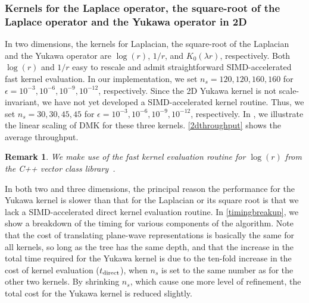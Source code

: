 \documentclass[final,letterpaper]{siamart171218}
\newtheorem{remark}[theorem]{Remark}
\newcommand{\acron}{DMK }
\begin{document}
\subsubsection{Kernels for the Laplace operator, 
the square-root of the Laplace operator and the Yukawa operator in 2D}

In two dimensions, the kernels for
Laplacian, the square-root of the Laplacian and the Yukawa operator are $\log(r)$, 
$1/r$, and $K_0(\lambda r)$, respectively. Both $\log(r)$ and $1/r$
easy to rescale and admit straightforward SIMD-accelerated fast kernel evaluation.
In our implementation, we set
$n_s = 120, 120, 160, 160$ for $\epsilon = 10^{-3}, 10^{-6}, 10^{-9}, 10^{-12}$, respectively.
Since the 2D Yukawa kernel is not scale-invariant, we have not yet developed a
SIMD-accelerated kernel routine. Thus, we set $n_s = 30, 30, 45, 45$ for
$\epsilon = 10^{-3}, 10^{-6}, 10^{-9}, 10^{-12}$, respectively.
In , we illustrate the linear scaling of \acron
for these three kernels. \cref{2dthroughput} shows the average throughput.

\begin{remark}
  We make use of the fast kernel evaluation routine for $\log(r)$ from the C++ vector
  class library~\cite{vcl}. 
\end{remark}

In both two and three dimensions, the principal reason the performance
for the Yukawa kernel is slower than that for the Laplacian or its square root is that
we lack a SIMD-accelerated direct kernel evaluation routine.
In \cref{timingbreakup}, we show a breakdown of the timing for various
components of the algorithm.
Note that the cost of translating plane-wave representations is basically the same
for all kernels, so long as the tree has the same depth, and that the increase
in the total time required for the Yukawa kernel is due to the ten-fold increase
in the cost of kernel evaluation ($t_{\rm direct}$),
when $n_s$ is set to the same number as for the other two kernels.
By shrinking $n_s$, which cause one more level of refinement,
the total cost for the Yukawa kernel is reduced slightly.
\end{document}
